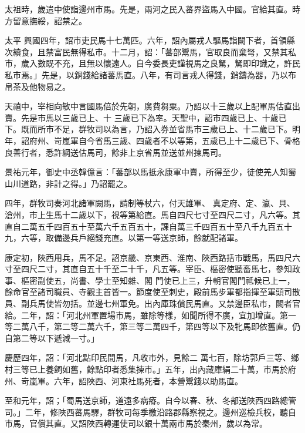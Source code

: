 \begin{pinyinscope}
 太祖時，歲遣中使詣邊州市馬。先是，兩河之民入蕃界盜馬入中國。官給其直。時方留意撫綏，詔禁之。



 太平
 興國四年，詔市吏民馬十七萬匹。六年，詔內屬戎人驅馬詣闕下者，首領縣次續食，且禁富民無得私市。十二月，詔：「蕃部鬻馬，官取良而棄弩，又禁其私市，歲入數既不充，且無以懷遠人。自今委長吏謹視馬之良駑，駑即印識之，許民私市焉。」先是，以銅錢給諸蕃馬直。八年，有司言戎人得錢，銷鑄為器，乃以布帛茶及他物易之。



 天禧中，宰相向敏中言國馬倍於先朝，廣費芻粟。乃詔以十三歲以上配軍馬估直出賣。先是市馬以三歲已上、十
 三歲已下為率。天聖中，詔市四歲已上、十歲已下。既而所市不足，群牧司以為言，乃詔入券並省馬市三歲已上、十二歲已下。明年，詔府州、岢嵐軍自今省馬三歲、四歲者不以等第，五歲已上十二歲已下、骨格良善行者，悉許綱送估馬司，餘非上京省馬並送並州揀馬司。



 景祐元年，御史中丞韓億言：「蕃部以馬抵永康軍中賣，所得至少，徒使羌人知蜀山川道路，非計之得。」乃詔罷之。



 四年，群牧司奏河北諸軍闕馬，請制等杖六，付天雄軍、
 真定府、定、瀛、貝、滄州，市上生馬十二歲以下，視等第給直。馬自四尺七寸至四尺二寸，凡六等。其直自二萬五千四百五十至萬六千五百五十，課自萬三千四百五十至八千九百五十九，六等，取備邊兵戶絕錢充直。以第一等送京師，餘就配諸軍。



 康定初，陜西用兵，馬不足。詔京畿、京東西、淮南、陜西路括市戰馬，馬四尺六寸至四尺二寸，其直自五十千至二十千，凡五等。宰臣、樞密使聽畜馬七，參知政事、樞密副使五，尚書、學士至知雜、閣
 門使已上三，升朝官閣門祗候已上一，餘命官至諸司職員、寺觀主首皆一。節度使至刺史，殿前馬步軍都指揮至軍頭司散員、副兵馬使皆勿括。並邊七州軍免。出內庫珠償民馬直。又禁邊臣私市，闕者官給。二年，詔：「河北州軍置場市馬，雖除等樣，如聞所得不廣，宜加增直。第一等二萬八千，第二等二萬六千，第三等二萬四千，第四等以下及牝馬即依舊直。仍自第二等以下遞減一寸。」



 慶歷四年，詔：「河北點印民間馬，凡收市外，見餘二
 萬七百，除坊郭戶三等、鄉村三等已上養飼如舊，餘點印者悉集揀市。」五年，出內藏庫絹二十萬，市馬於府州、岢嵐軍。六年，詔陜西、河東社馬死者，本營鬻錢以助馬直。



 至和元年，詔；「蜀馬送京師，道遠多病瘠。自今以春、秋、冬部送陜西四路總管司。」二年，修陜西蕃馬驛，群牧司每季檄沿路郡縣察視之。邊州巡檢兵校，聽自市馬，官償其直。又詔陜西轉運使司以銀十萬兩市馬於秦州，歲以為常。




\end{pinyinscope}
